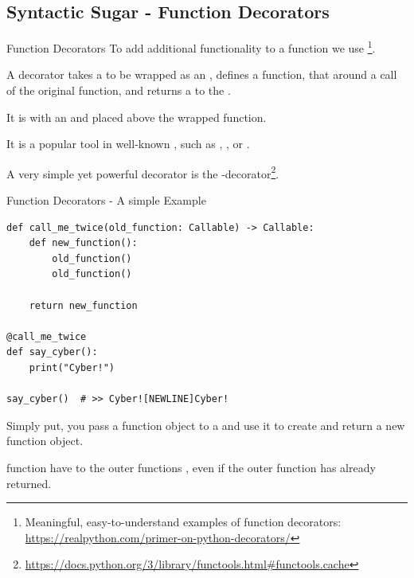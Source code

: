 \documentclass[12pt, aspectratio=169, usepdftitle=false]{beamer}
\newcommand{\pp}[1]{\lpl{#1}}
\newcommand{\furl}[1]{\footnote{\url{#1}}}
\begin{document}
\subsection{Syntactic Sugar - Function Decorators}
\begin{frame}{Function Decorators}
          To add additional functionality to a function we use 
        \footnote{Meaningful, easy-to-understand examples of function decorators: \url{https://realpython.com/primer-on-python-decorators/}}.

		\medskip
		
		A decorator takes a  to be wrapped as an , defines a  function, that  around a call of the original function,
		and returns a  to the .
		
		\medskip
		
		It is  with an \pp{@} and placed above the wrapped function.
		
		\medskip
		
		It is a popular tool in well-known , such as , , or \pp{discord.py}.
		
		\medskip
		
		A very simple yet powerful decorator is the \pp{@cache}-decorator\furl{https://docs.python.org/3/library/functools.html\#functools.cache}.
\end{frame}


\begin{frame}{Function Decorators - A simple Example}
	\begin{lstlisting}[language=pytiny]
def call_me_twice(old_function: Callable) -> Callable:
    def new_function():
        old_function()
        old_function()

    return new_function

@call_me_twice
def say_cyber():
    print("Cyber!")

say_cyber()  # >> Cyber![NEWLINE]Cyber!
	\end{lstlisting}
	
	Simply put, you pass a function object to a 
	and use it to create and return a new function object.
	
	\medskip
	
	 function have  to the outer functions , even if the outer function has already returned.
	
\end{frame}
\end{document}
